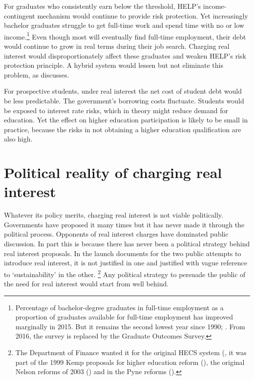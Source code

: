 \documentclass[embargoed]{grattan}
\begin{document}
For graduates who consistently earn below the threshold, \gls{HELP}'s income-contingent mechanism would continue to provide risk protection.
Yet increasingly bachelor graduates struggle to get full-time work and spend time with no or low income.\footnote{Percentage of bachelor-degree graduates in full-time employment as a proportion of graduates available for full-time employment has improved marginally in 2015.
But it remains the second lowest year since 1990; \textcite{GCAvariousyearsGradStatsemploymentsalary}.
From 2016, the survey is replaced by the Graduate Outcomes Survey.} Even though most will eventually find full-time employment, their debt would continue to grow in real terms during their job search.
Charging real interest would disproportionately affect these graduates and weaken \gls{HELP}'s risk protection principle.
A hybrid system would lessen but not eliminate this problem, as  discusses.

For prospective students, under real interest the net cost of student debt would be less predictable.
The government's borrowing costs fluctuate.
Students would be exposed to interest rate risks, which in theory might reduce demand for education.
Yet the effect on higher education participation is likely to be small in practice, because the risks in not obtaining a higher education qualification are also high.

\section{Political reality of charging real interest}\label{political-reality-of-charging-real-interest}

Whatever its policy merits, charging real interest is not viable politically.
Governments have proposed it many times but it has never made it through the political process.
Opponents of real interest charges have dominated public discussion.
In part this is because there has never been a political strategy behind real interest proposals.
In the launch documents for the two public attempts to introduce real interest, it is not justified in one and justified with vague reference to `sustainability' in the other.%
\footnote{The Department of Finance wanted it for the original \gls{HECS} system (\textcite{Archives19882015Cabinetsubmission5922}, it was part of the 1999 Kemp proposals for higher education reform (\textcite{Kemp2001Appendix4Leaked}), the original Nelson reforms of 2003 (\textcite{Nelson2003OuruniversitiesBacking}) and in the Pyne reforms (\textcite{Australia2014Budget201415}).} 
Any political strategy to persuade the public of the need for real interest would start from well behind.
\end{document}
